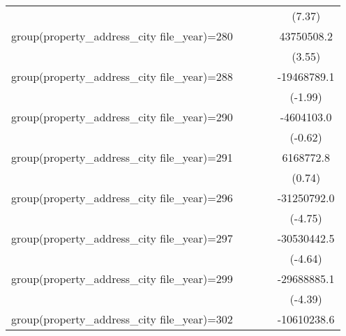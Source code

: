 {\begin{tabular}{l*{4}{c}}
                    &                     &                     &                     &      (7.37)         \\
\addlinespace
group(property\_address\_city file\_year)=280&                     &                     &                     &  43750508.2\sym{***}\\
                    &                     &                     &                     &      (3.55)         \\
\addlinespace
group(property\_address\_city file\_year)=288&                     &                     &                     & -19468789.1\sym{*}  \\
                    &                     &                     &                     &     (-1.99)         \\
\addlinespace
group(property\_address\_city file\_year)=290&                     &                     &                     &  -4604103.0         \\
                    &                     &                     &                     &     (-0.62)         \\
\addlinespace
group(property\_address\_city file\_year)=291&                     &                     &                     &   6168772.8         \\
                    &                     &                     &                     &      (0.74)         \\
\addlinespace
group(property\_address\_city file\_year)=296&                     &                     &                     & -31250792.0\sym{***}\\
                    &                     &                     &                     &     (-4.75)         \\
\addlinespace
group(property\_address\_city file\_year)=297&                     &                     &                     & -30530442.5\sym{***}\\
                    &                     &                     &                     &     (-4.64)         \\
\addlinespace
group(property\_address\_city file\_year)=299&                     &                     &                     & -29688885.1\sym{***}\\
                    &                     &                     &                     &     (-4.39)         \\
\addlinespace
group(property\_address\_city file\_year)=302&                     &                     &                     & -10610238.6         \\

\end{tabular}}
